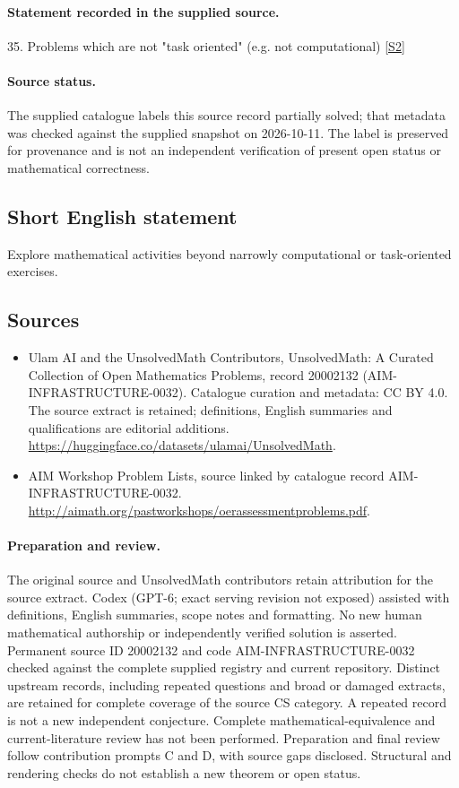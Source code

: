 \documentclass[11pt]{article}
\newcommand{\sref}[2]{\hyperlink{source:#1:#2}{[S#2]}}
\begin{document}
\paragraph{Statement recorded in the supplied source.}
35. Problems which are not "task oriented" (e.g. not computational) \sref{20002132}{2}
\paragraph{Source status.}
The supplied catalogue labels this source record partially solved; that metadata was checked against the supplied snapshot on 2026-10-11. The label is preserved for provenance and is not an independent verification of present open status or mathematical correctness.
\subsection{Short English statement}
Explore mathematical activities beyond narrowly computational or task-oriented exercises.
\subsection{Sources}
\begin{itemize}
\item[\hypertarget{source:20002132:1}{S1}] Ulam AI and the UnsolvedMath Contributors, UnsolvedMath: A Curated Collection of Open Mathematics Problems, record 20002132 (AIM-INFRASTRUCTURE-0032). Catalogue curation and metadata: CC BY 4.0. The source extract is retained; definitions, English summaries and qualifications are editorial additions.
\url{https://huggingface.co/datasets/ulamai/UnsolvedMath}.
\item[\hypertarget{source:20002132:2}{S2}] AIM Workshop Problem Lists, source linked by catalogue record AIM-INFRASTRUCTURE-0032.
\url{http://aimath.org/pastworkshops/oerassessmentproblems.pdf}.
\end{itemize}
\paragraph{Preparation and review.}
The original source and UnsolvedMath contributors retain attribution for the source extract. Codex (GPT-6; exact serving revision not exposed) assisted with definitions, English summaries, scope notes and formatting. No new human mathematical authorship or independently verified solution is asserted. Permanent source ID 20002132 and code AIM-INFRASTRUCTURE-0032 checked against the complete supplied registry and current repository. Distinct upstream records, including repeated questions and broad or damaged extracts, are retained for complete coverage of the source CS category. A repeated record is not a new independent conjecture. Complete mathematical-equivalence and current-literature review has not been performed. Preparation and final review follow contribution prompts C and D, with source gaps disclosed. Structural and rendering checks do not establish a new theorem or open status.
\label{end:20002132}
\end{document}
